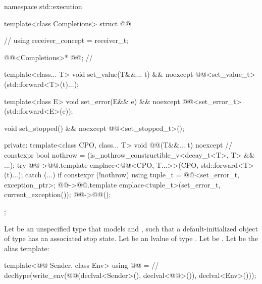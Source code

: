 %
\begin{codeblock}
namespace std::execution {
  template<class Completions>
  struct @@ {                                // \expos
    using receiver_concept = receiver_t;

    @@<Completions>* @@;                // \expos

    template<class... T>
      void set_value(T&&... t) && noexcept {
        @@<set_value_t>(std::forward<T>(t)...);
      }

    template<class E>
      void set_error(E&& e) && noexcept {
        @@<set_error_t>(std::forward<E>(e));
      }

    void set_stopped() && noexcept {
      @@<set_stopped_t>();
    }

  private:
    template<class CPO, class... T>
      void @@(T&&... t) noexcept {                    // \expos
        constexpr bool nothrow = (is_nothrow_constructible_v<decay_t<T>, T> && ...);
        try {
          @@->@@.template emplace<@@<CPO, T...>>(CPO{},
                                                                   std::forward<T>(t)...);
        }
        catch (...) {
          if constexpr (!nothrow) {
            using tuple_t = @@<set_error_t, exception_ptr>;
            @@->@@.template emplace<tuple_t>(set_error_t{}, current_exception());
          }
        }
        @@->@@();
      }
  };
}
\end{codeblock}

\pnum
Let  be an unspecified type
that models  and ,
such that a default-initialized object of type 
has an associated stop state.
Let  be an lvalue of type .
Let  be .
Let  be the alias template:

\begin{codeblock}
template<@@ Sender, class Env>
using @@ =                                   // \expos
  decltype(write_env(@@(declval<Sender>(), declval<@@>()), declval<Env>()));
\end{codeblock}

